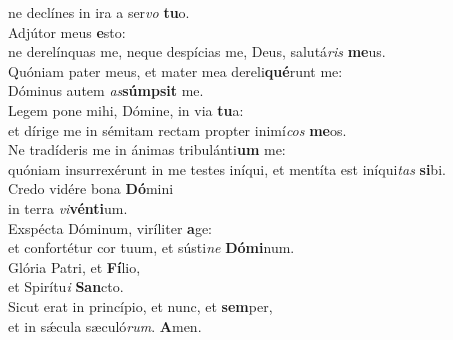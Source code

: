\evenverse ne declínes in ira a ser\textit{vo} \textbf{tu}o.\\
\oddverse Adjútor meus \textbf{e}sto:~\*\\
\oddverse ne derelínquas me, neque despícias me, Deus, salutá\textit{ris} \textbf{me}us.\\
\evenverse Quóniam pater meus, et mater mea dereli\textbf{qué}runt me:~\*\\
\evenverse Dóminus autem \textit{as}\textbf{súm}\textbf{psit} me.\\
\oddverse Legem pone mihi, Dómine, in via \textbf{tu}a:~\*\\
\oddverse et dírige me in sémitam rectam propter inimí\textit{cos} \textbf{me}os.\\
\evenverse Ne tradíderis me in ánimas tribulánti\textbf{um} me:~\*\\
\evenverse quóniam insurrexérunt in me testes iníqui, et mentíta est iníqui\textit{tas} \textbf{si}bi.\\
\oddverse Credo vidére bona \textbf{Dó}mini~\*\\
\oddverse in terra \textit{vi}\textbf{vén}\textbf{ti}um.\\
\evenverse Exspécta Dóminum, viríliter \textbf{a}ge:~\*\\
\evenverse et confortétur cor tuum, et sústi\textit{ne} \textbf{Dó}\textbf{mi}num.\\
\oddverse Glória Patri, et \textbf{Fí}lio,~\*\\
\oddverse et Spirítu\textit{i} \textbf{San}cto.\\
\evenverse Sicut erat in princípio, et nunc, et \textbf{sem}per,~\*\\
\evenverse et in sǽcula sæculó\textit{rum}. \textbf{A}men.\\
